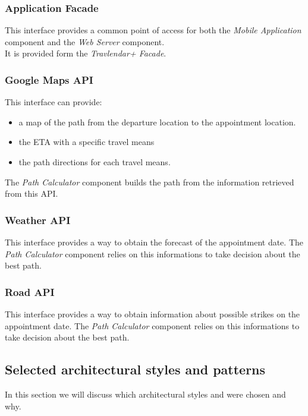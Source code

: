 \subsubsection{Application Facade}
This interface provides a common point of access for both the \emph{Mobile Application} component and the \emph{Web Server} component.\\
It is provided form the \emph{Travlendar+ Facade}.

\subsubsection{Google Maps API}
This interface can provide:
\begin{itemize}
	\item a map of the path from the departure location to the appointment location.
	\item the ETA with a specific travel means
	\item the path directions for each travel means.
\end{itemize}
The \emph{Path Calculator} component builds the path from the information retrieved from this API.

\subsubsection{Weather API}
This interface provides a way to obtain the forecast of the appointment date.
The \emph{Path Calculator} component relies on this informations to take decision about the best path.

\subsubsection{Road API}
This interface provides a way to obtain information about possible strikes on the appointment date.
The \emph{Path Calculator} component relies on this informations to take decision about the best path.

\clearpage
\subsection{Selected architectural styles and patterns}
In this section we will discuss which architectural styles and were chosen and why.
